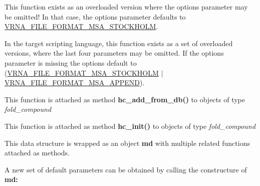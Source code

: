 \begin{DoxyRefList}
This function exists as an overloaded version where the {\ttfamily options} parameter may be omitted! In that case, the {\ttfamily options} parameter defaults to \mbox{\hyperlink{group__file__utils_ga62be992445cd8ab2ad7a8fded944338b}{V\+R\+N\+A\+\_\+\+F\+I\+L\+E\+\_\+\+F\+O\+R\+M\+A\+T\+\_\+\+M\+S\+A\+\_\+\+S\+T\+O\+C\+K\+H\+O\+LM}}.  
\item[\label{wrappers__wrappers000062}%
\Hypertarget{wrappers__wrappers000062}%
Global \mbox{\hyperlink{group__file__utils_ga0c90faf1515ce0b16620036b1055ff1e}{vrna\+\_\+file\+\_\+msa\+\_\+write}} (const char $\ast$filename, const char $\ast$$\ast$names, const char $\ast$$\ast$aln, const char $\ast$id, const char $\ast$structure, const char $\ast$source, unsigned int options)]In the target scripting language, this function exists as a set of overloaded versions, where the last four parameters may be omitted. If the {\ttfamily options} parameter is missing the options default to (\mbox{\hyperlink{group__file__utils_ga62be992445cd8ab2ad7a8fded944338b}{V\+R\+N\+A\+\_\+\+F\+I\+L\+E\+\_\+\+F\+O\+R\+M\+A\+T\+\_\+\+M\+S\+A\+\_\+\+S\+T\+O\+C\+K\+H\+O\+LM}} $\vert$ \mbox{\hyperlink{group__file__utils_ga1577ea0f497d9c501549c863a4f2c089}{V\+R\+N\+A\+\_\+\+F\+I\+L\+E\+\_\+\+F\+O\+R\+M\+A\+T\+\_\+\+M\+S\+A\+\_\+\+A\+P\+P\+E\+ND}}).  
\item[\label{wrappers__wrappers000010}%
\Hypertarget{wrappers__wrappers000010}%
Global \mbox{\hyperlink{group__hard__constraints_ga5b4de3247b67358080c176b94591a8e6}{vrna\+\_\+hc\+\_\+add\+\_\+from\+\_\+db}} (vrna\+\_\+fold\+\_\+compound\+\_\+t $\ast$vc, const char $\ast$constraint, unsigned int options)]This function is attached as method {\bfseries hc\+\_\+add\+\_\+from\+\_\+db()} to objects of type {\itshape fold\+\_\+compound}  
\item[\label{wrappers__wrappers000006}%
\Hypertarget{wrappers__wrappers000006}%
Global \mbox{\hyperlink{group__hard__constraints_ga36ff456c43bf920629cee5a236e4f0ff}{vrna\+\_\+hc\+\_\+init}} (vrna\+\_\+fold\+\_\+compound\+\_\+t $\ast$vc)]This function is attached as method {\bfseries hc\+\_\+init()} to objects of type {\itshape fold\+\_\+compound}  
\item[\label{wrappers__wrappers000077}%
\Hypertarget{wrappers__wrappers000077}%
Class \mbox{\hyperlink{group__model__details}{vrna\+\_\+md\+\_\+s}} ]This data structure is wrapped as an object {\bfseries md} with multiple related functions attached as methods.

A new set of default parameters can be obtained by calling the constructure of {\bfseries md\+:} ~\newline


\end{DoxyRefList}
